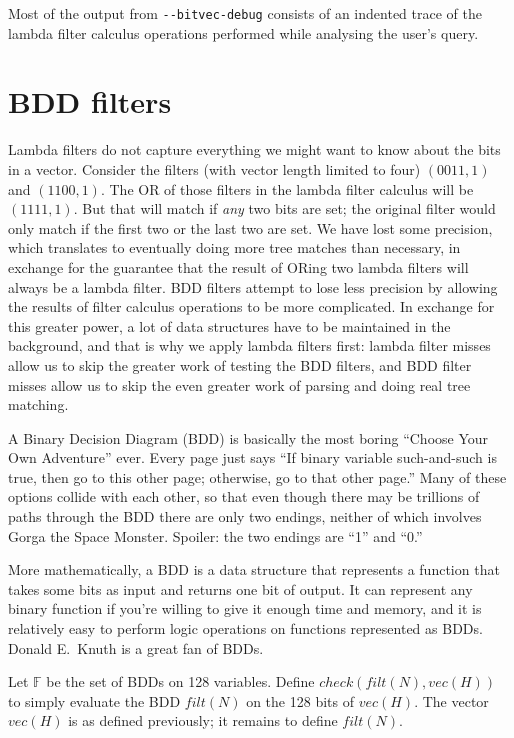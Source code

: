 \documentclass[twocolumn]{report}
\newcommand{\DangerousSection}{\marginpar{\large\hfill
\raisebox{-0.5\baselineskip}[0pt][0pt]{\dbend}\hfill\null}}
\begin{document}
Most of the output from \texttt{-{}-bitvec-debug} consists of an indented
trace of the lambda filter calculus operations performed while analysing the
user's query.


\section{BDD filters}\DangerousSection

Lambda filters do not capture everything we might want to
know about the bits in a vector.  Consider the filters (with vector length
limited to four) $(0011,1)$ and $(1100,1)$.  The OR of those filters in the
lambda filter calculus will be $(1111,1)$.  But that will match if
\emph{any} two bits are set; the original filter would only match if the
first two or the last two are set.  We have lost some precision, which
translates to eventually doing more tree matches than necessary, in exchange
for the guarantee that the result of ORing two lambda filters will always be
a lambda filter.  BDD filters attempt to lose less precision by allowing the
results of filter calculus operations to be more complicated.  In exchange
for this greater power, a lot of data structures have to be maintained in
the background, and that is why we apply lambda filters first: lambda filter
misses allow us to skip the greater work of testing the BDD filters, and BDD
filter misses allow us to skip the even greater work of parsing and doing
real tree matching.

A Binary Decision Diagram (BDD) is basically the most boring ``Choose Your
Own Adventure'' ever.  Every page just says ``If binary variable
such-and-such is true, then go to this other page; otherwise, go to that
other page.'' Many of these options collide with each other, so that even
though there may be trillions of paths through the BDD there are only two
endings, neither of which involves Gorga the Space Monster.  Spoiler: the
two endings are ``1'' and ``0.''

More mathematically, a BDD is a data structure that represents a function
that takes some bits as input and returns one bit of output.  It can
represent any binary function if you're willing to give it enough time and
memory, and it is relatively easy to perform logic operations on functions
represented as BDDs.  Donald E.\ Knuth is a great fan of BDDs.

Let $\mathbb{F}$ be the set of BDDs on 128 variables.  Define
$\mathit{check}(\mathit{filt}(N),\mathit{vec}(H))$ to simply evaluate the
BDD $\mathit{filt}(N)$ on the 128 bits of $\mathit{vec}(H)$.  The vector
$\mathit{vec}(H)$ is as defined previously; it remains to define
$\mathit{filt}(N)$.
\end{document}
